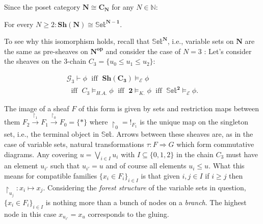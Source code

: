   \newpage
  Since the poset category $\mathbf{N} \cong \mathbf{C_N}$ for any $N \in \mathbb{N}$: 
  
  \begin{lem}
  	  For every $N \geq 2 :
  		 \mathbf{Sh}(\mathbf{{N}}) \cong  \mathbb{Set}^\mathbf{N-1}.$   
  \end{lem}
  
  To see why this isomorphism holds, recall that $\mathbb{Set}^\mathbf{N}$, i.e., variable sets on $\mathbf{{N}}$ are the same as pre-sheaves on $\mathbf{{N}^{op}}$ and  consider the case of $N=3$ :
  \newline
Let's consider the sheaves on the 3-chain $C_3 = \{u_0 \leq u_1 \leq u_2\}$:
  
  \begin{prop}
  	 \begin{gather*}
  		\mathcal{G}_{3} \vdash \phi \;\text{ iff }\;\mathbf{Sh}(\mathbf{C_{3}}) \models_{\mathcal{E}} \phi \\
  		\;\text{ iff }\; C_{3} \models_{H.A.} \phi  \;\text{ iff }\; \mathbf{2} \models_{K.} \phi  \;\text{ iff }\; \mathbb{Set}^\mathbf{2} \models_{\mathcal{E}} \phi.     
  	\end{gather*}
  	\end{prop}
  	\begin{remark}
  		The image of a sheaf $F$ of this form is given by sets and restriction maps between them $F_2 \xrightarrow{\restriction_1} F_1 \xrightarrow{\restriction_0} F_0=\{*\}$ where $ \restriction_0 = !_{F_1} $ is the unique map on the singleton set, i.e., the terminal object in $\mathbb{Set}$.
  		\newline
  		Arrows between these sheaves are, as in the case of variable sets, natural transformations $\tau: F \Rightarrow G$ which form commutative diagrams. 
  		\newline
  			Any covering $u = \bigvee_{i \in I} u_i$ with $I \subseteq \{0,1,2\}$ in the chain $C_3$ must have an element $u_{i'}$ such that $u_{i'} = u$ and of course all elements $u_i \leq u$. 
  		\newline
  			What this means for compatible families $\{x_i \in F_i\}_{i \in I}$ is that given $i,j \in I$ if $i \geq j$ then $\restriction_{u_j}: x_i \mapsto x_j$.
  		\newline
  			Considering the \emph{forest structure} of the variable sets in question,  $\{x_i \in F_i\}_{i \in I}$ is nothing more than a bunch of nodes on a \emph{branch}.
  			The highest node in this case $x_{u_{i'}} = x_u$ corresponds to the gluing.
  	\end{remark}

